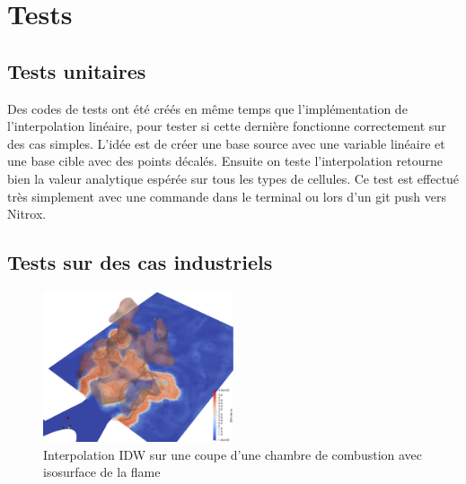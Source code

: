 \section{Tests}
\subsection{Tests unitaires}
Des codes de tests ont été créés en même temps que l'implémentation de l'interpolation linéaire, pour tester si cette dernière fonctionne correctement sur des cas simples.
L'idée est de créer une base source avec une variable linéaire et une base cible avec des points décalés. Ensuite on teste l'interpolation retourne bien la valeur analytique espérée sur tous les types de cellules. Ce test est effectué très simplement avec une commande dans le terminal ou lors d'un git push vers Nitrox.



\subsection{Tests sur des cas industriels}

\begin{figure}[H]
    \centering
    \includegraphics[width=0.50\textwidth]{images/cb-IDW.png}
    \caption{Interpolation IDW sur une coupe d'une chambre de combustion avec isosurface de la flame}
    \label{fig:cb-IDW}
\end{figure}


